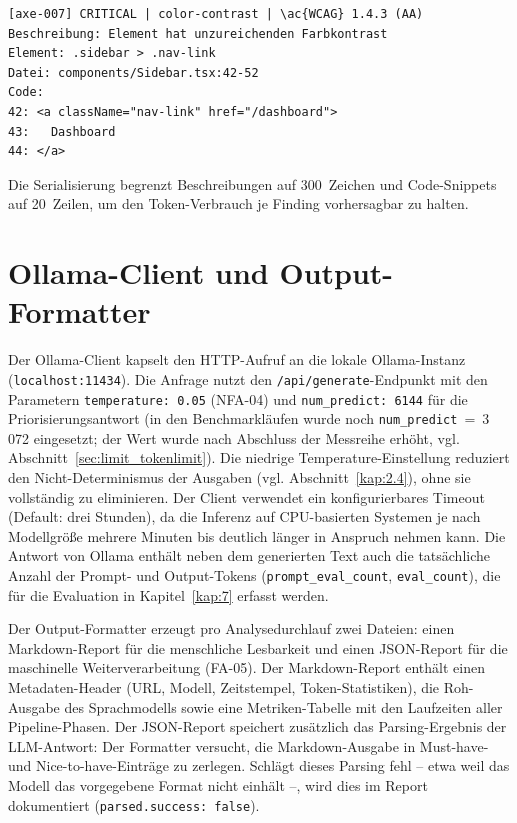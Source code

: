 \begin{lstlisting}[language={}, caption={Serialisiertes Finding im Prompt}, label={lst:serialized}]
[axe-007] CRITICAL | color-contrast | \ac{WCAG} 1.4.3 (AA)
Beschreibung: Element hat unzureichenden Farbkontrast
Element: .sidebar > .nav-link
Datei: components/Sidebar.tsx:42-52
Code:
42: <a className="nav-link" href="/dashboard">
43:   Dashboard
44: </a>
\end{lstlisting}

Die Serialisierung begrenzt Beschreibungen auf 300~Zeichen und Code-Snippets auf 20~Zeilen, um den Token-Verbrauch je Finding vorhersagbar zu halten.

\section{Ollama-Client und Output-Formatter}
\label{sec:impl-ollama}
\label{sec:impl-output}

Der Ollama-Client kapselt den HTTP-Aufruf an die lokale Ollama-Instanz (\texttt{localhost:11434}). Die Anfrage nutzt den \texttt{/api/generate}-Endpunkt mit den Parametern \texttt{temperature: 0.05} (\ac{NFA}-04) und \texttt{num\_predict: 6144} für die Priorisierungsantwort (in den Benchmarkläufen wurde noch \texttt{num\_predict}~=~3\,072 eingesetzt; der Wert wurde nach Abschluss der Messreihe erhöht, vgl. Abschnitt~\ref{sec:limit_tokenlimit}). Die niedrige Temperature-Einstellung reduziert den Nicht-Determinismus der Ausgaben (vgl. Abschnitt~\ref{kap:2.4}), ohne sie vollständig zu eliminieren. Der Client verwendet ein konfigurierbares Timeout (Default: drei Stunden), da die Inferenz auf \ac{CPU}-basierten Systemen je nach Modellgröße mehrere Minuten bis deutlich länger in Anspruch nehmen kann. Die Antwort von Ollama enthält neben dem generierten Text auch die tatsächliche Anzahl der Prompt- und Output-Tokens (\texttt{prompt\_eval\_count}, \texttt{eval\_count}), die für die Evaluation in Kapitel~\ref{kap:7} erfasst werden.

Der Output-Formatter erzeugt pro Analysedurchlauf zwei Dateien: einen Markdown-Report für die menschliche Lesbarkeit und einen \ac{JSON}-Report für die maschinelle Weiterverarbeitung (\ac{FA}-05). Der Markdown-Report enthält einen Metadaten-Header (URL, Modell, Zeitstempel, Token-Statistiken), die Roh-Ausgabe des Sprachmodells sowie eine Metriken-Tabelle mit den Laufzeiten aller Pipeline-Phasen. Der \ac{JSON}-Report speichert zusätzlich das Parsing-Ergebnis der \ac{LLM}-Antwort: Der Formatter versucht, die Markdown-Ausgabe in Must-have- und Nice-to-have-Einträge zu zerlegen. Schlägt dieses Parsing fehl -- etwa weil das Modell das vorgegebene Format nicht einhält --, wird dies im Report dokumentiert (\texttt{parsed.success: false}).

